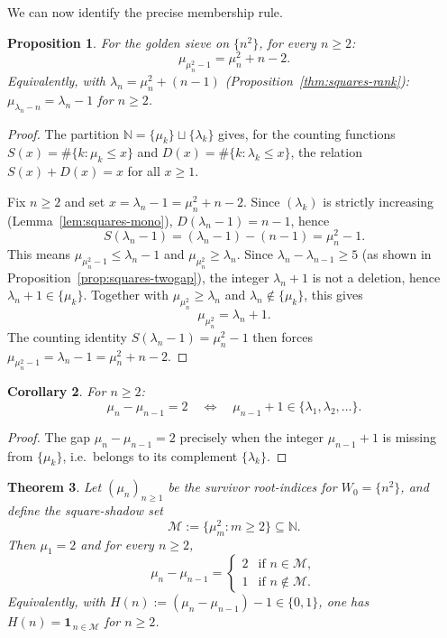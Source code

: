 \documentclass[11pt]{article}
\numberwithin{equation}{section}
\theoremstyle{plain}
\newtheorem{theorem}{Theorem}[section]
\newtheorem{proposition}[theorem]{Proposition}
\newtheorem{corollary}[theorem]{Corollary}
\theoremstyle{definition}
\theoremstyle{remark}
\newcommand{\N}{\mathbb{N}}
\begin{document}
We can now identify the precise membership rule.

\begin{proposition}%
\label{thm:squares-selfref}
For the golden sieve on $\{n^2\}$, for every $n\ge2$:
\begin{equation}\label{eq:squares-selfref}
  \mu_{\mu_n^2-1} = \mu_n^2+n-2.
\end{equation}
Equivalently, with $\lambda_n=\mu_n^2+(n-1)$
(Proposition~\ref{thm:squares-rank}):
$\mu_{\lambda_n-n}=\lambda_n-1$ for $n\ge2$.
\end{proposition}

\begin{proof}
The partition $\N=\{\mu_k\}\sqcup\{\lambda_k\}$ gives, for the counting
functions $S(x)=\#\{k:\mu_k\le x\}$ and $D(x)=\#\{k:\lambda_k\le x\}$,
the relation $S(x)+D(x)=x$ for all $x\ge1$.

Fix $n\ge2$ and set $x=\lambda_n-1=\mu_n^2+n-2$.  Since $(\lambda_k)$ is
strictly increasing (Lemma~\ref{lem:squares-mono}), $D(\lambda_n-1)=n-1$, hence
\[
  S(\lambda_n-1)=(\lambda_n-1)-(n-1)=\mu_n^2-1.
\]
This means $\mu_{\mu_n^2-1}\le \lambda_n-1$ and
$\mu_{\mu_n^2}\ge \lambda_n$.
Since $\lambda_n-\lambda_{n-1}\ge 5$ (as shown in
Proposition~\ref{prop:squares-twogap}), the integer $\lambda_n+1$
is not a deletion, hence $\lambda_n+1\in\{\mu_k\}$.
Together with $\mu_{\mu_n^2}\ge\lambda_n$ and
$\lambda_n\notin\{\mu_k\}$, this gives
\[
  \mu_{\mu_n^2}=\lambda_n+1.
\]
The counting identity $S(\lambda_n-1)=\mu_n^2-1$ then forces
$\mu_{\mu_n^2-1}=\lambda_n-1=\mu_n^2+n-2$.
\end{proof}

\begin{corollary}\label{cor:metahiccup}
For $n\ge2$:
\[
  \mu_n-\mu_{n-1}=2
  \quad\Longleftrightarrow\quad
  \mu_{n-1}+1\in\{\lambda_1,\lambda_2,\ldots\}.
\]
\end{corollary}

\begin{proof}
The gap $\mu_n-\mu_{n-1}=2$ precisely when the integer
$\mu_{n-1}+1$ is missing from $\{\mu_k\}$, i.e.\ belongs to
its complement $\{\lambda_k\}$.
\end{proof}

\begin{theorem}%
\label{thm:squares-hiccup-surv}
Let $(\mu_n)_{n\ge1}$ be the survivor root-indices for $W_0=\{n^2\}$, and
define the \emph{square-shadow set}
\[
  \mathcal{M} := \{\mu_m^2 : m\ge2\}\subseteq\N.
\]
Then $\mu_1=2$ and for every $n\ge2$,
\begin{equation}\label{eq:squares-hiccup-surv}
  \mu_n-\mu_{n-1}=
  \begin{cases}
    2 & \text{if } n\in \mathcal{M},\\
    1 & \text{if } n\notin \mathcal{M}.
  \end{cases}
\end{equation}
Equivalently, with $H(n):=(\mu_n-\mu_{n-1})-1\in\{0,1\}$, one has
$H(n)=\mathbf{1}_{\,n\in\mathcal{M}}$ for $n\ge2$.
\end{theorem}
\end{document}
